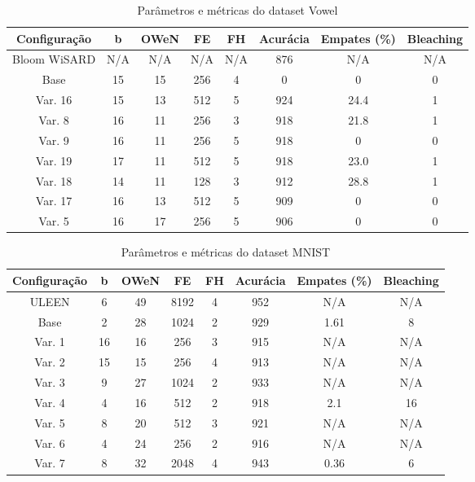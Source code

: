 \documentclass{article}
\begin{document}
{\begin{table}[H]
\caption{Parâmetros e métricas do dataset Vowel}
\begin{tabular}{|c|c|c|c|c|c|c|c|}
\hline
\textbf{Configuração} & \textbf{b} & \textbf{OWeN} & \textbf{FE} & \textbf{FH} & \textbf{Acurácia} & \textbf{Empates (\%)} & \textbf{Bleaching} \\
\hline
Bloom WiSARD & N/A & N/A & N/A & N/A & 876 & N/A & N/A \\
\hline
Base & 15 & 15 & 256 & 4 & 0 & 0 & 0 \\
\hline
Var. 16 & 15 & 13 & 512 & 5 & 924 & 24.4 & 1 \\
\hline
Var. 8 & 16 & 11 & 256 & 3 & 918 & 21.8 & 1 \\
\hline
Var. 9 & 16 & 11 & 256 & 5 & 918 & 0 & 0 \\
\hline
Var. 19 & 17 & 11 & 512 & 5 & 918 & 23.0 & 1 \\
\hline
Var. 18 & 14 & 11 & 128 & 3 & 912 & 28.8 & 1 \\
\hline
Var. 17 & 16 & 13 & 512 & 5 & 909 & 0 & 0 \\
\hline
Var. 5 & 16 & 17 & 256 & 5 & 906 & 0 & 0 \\
\hline
\end{tabular}
\end{table}

\begin{table}[H]
\caption{Parâmetros e métricas do dataset MNIST}
\begin{tabular}{|c|c|c|c|c|c|c|c|}
\hline
\textbf{Configuração} & \textbf{b} & \textbf{OWeN} & \textbf{FE} & \textbf{FH} & \textbf{Acurácia} & \textbf{Empates (\%)} & \textbf{Bleaching} \\
\hline
ULEEN & 6 & 49 & 8192 & 4 & 952 & N/A & N/A \\
\hline
Base & 2 & 28 & 1024 & 2 & 929 & 1.61 & 8 \\
\hline
Var. 1 & 16 & 16 & 256 & 3 & 915 & N/A & N/A \\
\hline
Var. 2 & 15 & 15 & 256 & 4 & 913 & N/A & N/A \\
\hline
Var. 3 & 9 & 27 & 1024 & 2 & 933 & N/A & N/A \\
\hline
Var. 4 & 4 & 16 & 512 & 2 & 918 & 2.1 & 16 \\
\hline
Var. 5 & 8 & 20 & 512 & 3 & 921 & N/A & N/A \\
\hline
Var. 6 & 4 & 24 & 256 & 2 & 916 & N/A & N/A \\
\hline
Var. 7 & 8 & 32 & 2048 & 4 & 943 & 0.36 & 6 \\
\hline
\end{tabular}
\end{table}
}
\end{document}
